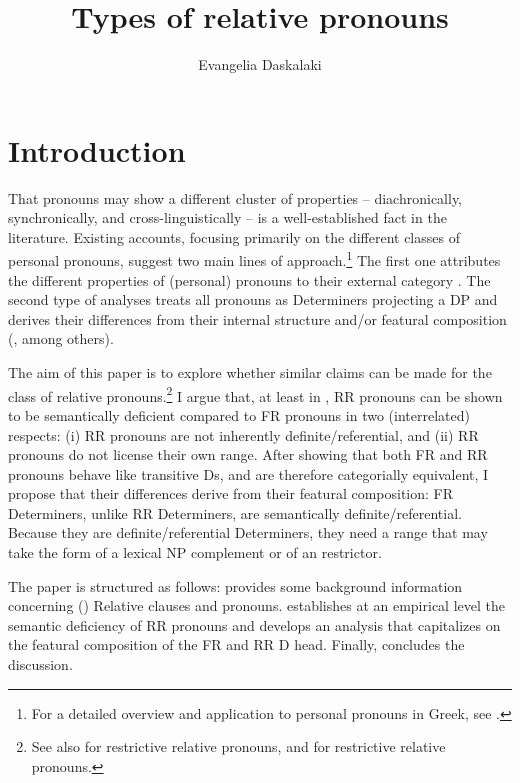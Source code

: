 \documentclass[output=paper]{langsci/langscibook}
\author{Evangelia Daskalaki\affiliation{University of Alberta}}
\title{Types of relative pronouns}
\begin{document}
\glsresetall


\section{Introduction}\label{sec:key:01.1}

That pronouns may show a different cluster of properties -- diachronically,
synchronically, and cross-linguistically -- is a well-established fact in the
literature. Existing accounts, focusing primarily on the different classes of
personal pronouns, suggest two main lines of approach.\footnote{For a detailed
overview and application to personal pronouns in Greek, see
\citet{Mavrogiorgos2010}.} The first one attributes the different properties of
(personal) pronouns to their external category
\parencite{CarSta1999,DecWil2002}. The second type of analyses treats all
pronouns as Determiners projecting a DP and derives their differences from
their internal structure and/or featural composition
(\citealt{Abney1987,Cardinaletti1994,Uriagereka1995}, among others).

The aim of this paper is to explore whether similar claims can be made for the
class of relative pronouns.\footnote{See also \citet{Sportiche2011} for
     restrictive relative pronouns, and \citet{Wiltschko1998} for
 restrictive relative pronouns.} I argue that, at least in
, \gls{RR} pronouns can be shown to be semantically deficient
compared to \gls{FR} pronouns in two (interrelated) respects: (i) \gls{RR}
pronouns are not inherently definite/referential, and (ii) \gls{RR} pronouns do
not license their own range. After showing that both \gls{FR} and \gls{RR}
pronouns behave like transitive Ds, and are therefore categorially equivalent,
I propose that their differences derive from their featural composition:
\gls{FR} Determiners, unlike \gls{RR} Determiners, are semantically
definite/referential. Because they are definite/referential Determiners, they
need a range that may take the form of a lexical NP complement or of an 
restrictor.

The paper is structured as follows:  provides some
background information concerning () Relative clauses and pronouns.
 establishes at an empirical level the semantic deficiency
of \gls{RR} pronouns and  develops an analysis that
capitalizes on the featural composition of the \gls{FR} and \gls{RR} D head.
Finally,  concludes the discussion.
\end{document}
